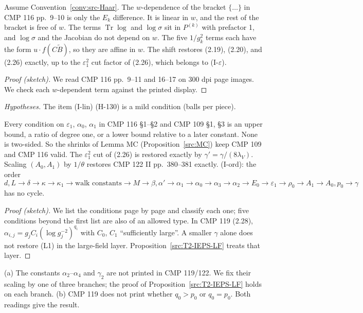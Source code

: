 \begin{proposition}\label{src:MC-IV0}
Assume Convention~\ref{conv:src-Haar}. The $w$-dependence of the bracket $\{\dots\}$ in CMP 116 pp.~9--10 is only the $E_k$ difference. It is linear in $w$, and the rest of the bracket is free of $w$. The terms $\operatorname{Tr}\log$ and $\log\sigma$ sit in $P^{(k)}$ with prefactor 1, and $\log\sigma$ and the Jacobian do not depend on $w$. The five $1/g_k^2$ terms each have the form $u\cdot f(C\tilde B)$, so they are affine in $w$. The shift restores (2.19), (2.20), and (2.26) exactly, up to the $\varepsilon_1^2$ cut factor of (2.26), which belongs to (I-$\varepsilon$).
\end{proposition}
\begin{proof}[Proof (sketch)]
We read CMP 116 pp.~9--11 and 16--17 on 300 dpi page images. We check each $w$-dependent term against the printed display.
\end{proof}
\emph{Hypotheses.} The item (I-lin) (H-130) is a mild condition (balls per piece).

\begin{proposition}\label{src:T2-IEPS}
Every condition on $\varepsilon_1$, $\alpha_0$, $\alpha_1$ in CMP 116 \S1--\S2 and CMP 109 \S1, \S3 is an upper bound, a ratio of degree one, or a lower bound relative to a later constant. None is two-sided. So the shrinks of Lemma MC (Proposition~\ref{src:MC}) keep CMP 109 and CMP 116 valid. The $\varepsilon_1^2$ cut of (2.26) is restored exactly by $\gamma'=\gamma/(8\lambda_V)$. Scaling $(A_0,A_1)$ by $1/\theta$ restores CMP 122 II pp.~380--381 exactly. (I-ord): the order
\[d,L\to\delta\to\kappa\to\kappa_1\to\text{walk constants}\to M\to\beta,\alpha'\to\alpha_1\to\alpha_0\to\alpha_3\to\alpha_2\to E_0\to\varepsilon_1\to\rho_0\to A_1\to A_0,p_0\to\gamma\]
has no cycle.
\end{proposition}
\begin{proof}[Proof (sketch)]
We list the conditions page by page and classify each one; five conditions beyond the first list are also of an allowed type. In CMP 119 (2.28), $\alpha_{i,j}=g_jC_i(\log g_j^{-2})^{q_i}$ with $C_0$, $C_1$ ``sufficiently large''. A smaller $\gamma$ alone does not restore (L1) in the large-field layer. Proposition~\ref{src:T2-IEPS-LF} treats that layer.
\end{proof}

\begin{convention}\label{conv:src-IEPS}
(a) The constants $\alpha_2$--$\alpha_4$ and $\gamma_2$ are not printed in CMP 119/122. We fix their scaling by one of three branches; the proof of Proposition~\ref{src:T2-IEPS-LF} holds on each branch. (b) CMP 119 does not print whether $q_0>p_0$ or $q_0=p_0$. Both readings give the result.
\end{convention}

